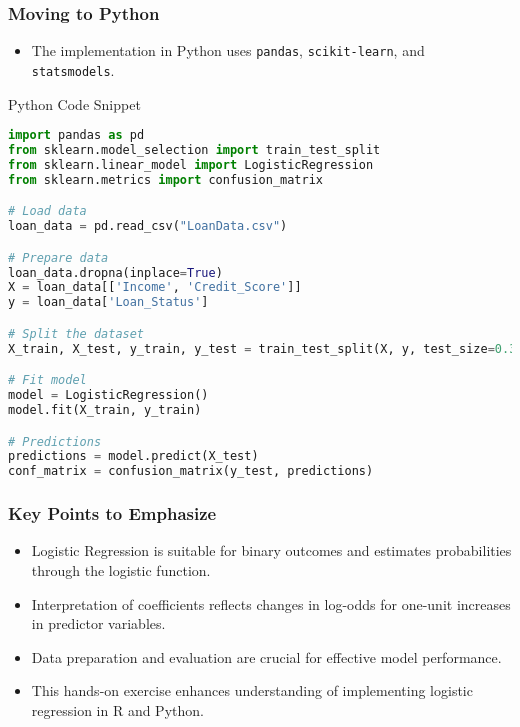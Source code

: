 \documentclass[aspectratio=169]{beamer}
\begin{document}
\begin{frame}[fragile]
    \frametitle{Moving to Python}
    \begin{itemize}
        \item The implementation in Python uses \texttt{pandas}, \texttt{scikit-learn}, and \texttt{statsmodels}.
    \end{itemize}
    \begin{block}{Python Code Snippet}
    \begin{lstlisting}[language=Python]
import pandas as pd
from sklearn.model_selection import train_test_split
from sklearn.linear_model import LogisticRegression
from sklearn.metrics import confusion_matrix

# Load data
loan_data = pd.read_csv("LoanData.csv")

# Prepare data
loan_data.dropna(inplace=True)
X = loan_data[['Income', 'Credit_Score']]
y = loan_data['Loan_Status']

# Split the dataset
X_train, X_test, y_train, y_test = train_test_split(X, y, test_size=0.3, random_state=123)

# Fit model
model = LogisticRegression()
model.fit(X_train, y_train)

# Predictions
predictions = model.predict(X_test)
conf_matrix = confusion_matrix(y_test, predictions)
    \end{lstlisting}
    \end{block}
\end{frame}

\begin{frame}[fragile]
    \frametitle{Key Points to Emphasize}
    \begin{itemize}
        \item Logistic Regression is suitable for binary outcomes and estimates probabilities through the logistic function.
        \item Interpretation of coefficients reflects changes in log-odds for one-unit increases in predictor variables.
        \item Data preparation and evaluation are crucial for effective model performance.
    \end{itemize}
    \begin{itemize}
        \item This hands-on exercise enhances understanding of implementing logistic regression in R and Python.
    \end{itemize}
\end{frame}
\end{document}
